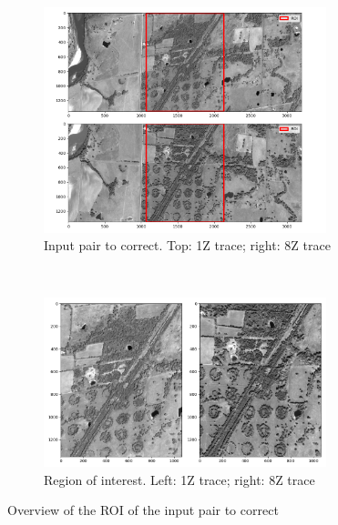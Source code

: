 \documentclass[paper=a4, fontsize=11pt, onecolumn, tikz, dvipsnames, svgnames, x11names]{article}
\begin{document}
\begin{figure}[H]
    \centering
    \begin{subfigure}[t]{0.8\textwidth}
        \centering
        \includegraphics[width = 0.9\textwidth]{ROI_d1_2.png}
        \caption{Input pair to correct. Top: 1Z trace; right: 8Z trace}
    \end{subfigure}%
    ~
    \vfill
    ~
    \begin{subfigure}[t]{0.8\textwidth}
        \centering
        \includegraphics[width = 0.9\textwidth]{ROI_only_match.png}
        \caption{Region of interest. Left: 1Z trace; right: 8Z trace}
    \end{subfigure}%
    \caption{Overview of the ROI of the input pair to correct}
    \label{fig_sift_input_pair}
\end{figure}
\end{document}

